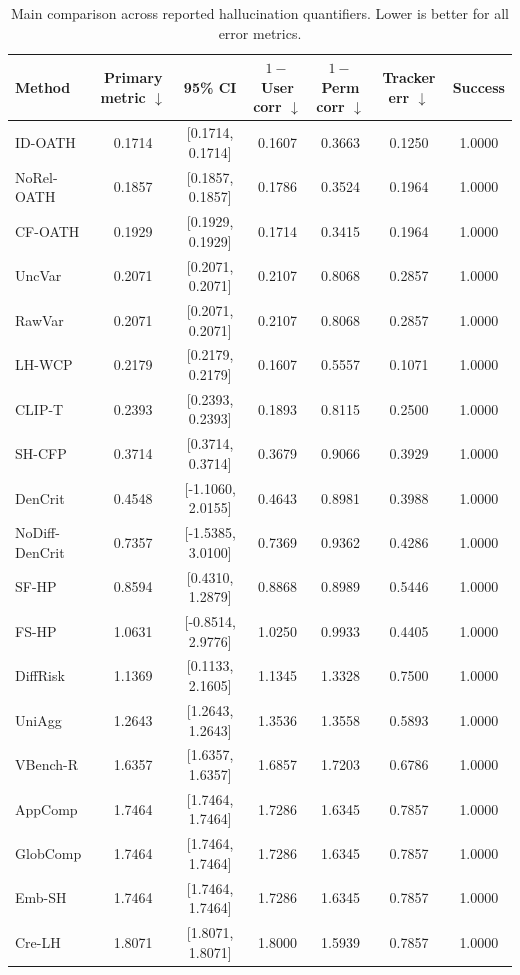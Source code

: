 \documentclass{article}
\begin{document}
\begin{table}[htbp]
    \centering
    \caption{Main comparison across reported hallucination quantifiers. Lower is better for all error metrics.}
    \label{tab:main_comparison}
    \begin{tabular}{lccccc c}
        \toprule
        Method & Primary metric \(\downarrow\) & 95\% CI & \(1-\)User corr \(\downarrow\) & \(1-\)Perm corr \(\downarrow\) & Tracker err \(\downarrow\) & Success \\
        \midrule
        ID-OATH & 0.1714 & [0.1714, 0.1714] & 0.1607 & 0.3663 & 0.1250 & 1.0000 \\
        NoRel-OATH & 0.1857 & [0.1857, 0.1857] & 0.1786 & 0.3524 & 0.1964 & 1.0000 \\
        CF-OATH & 0.1929 & [0.1929, 0.1929] & 0.1714 & 0.3415 & 0.1964 & 1.0000 \\
        UncVar & 0.2071 & [0.2071, 0.2071] & 0.2107 & 0.8068 & 0.2857 & 1.0000 \\
        RawVar & 0.2071 & [0.2071, 0.2071] & 0.2107 & 0.8068 & 0.2857 & 1.0000 \\
        LH-WCP & 0.2179 & [0.2179, 0.2179] & 0.1607 & 0.5557 & 0.1071 & 1.0000 \\
        CLIP-T & 0.2393 & [0.2393, 0.2393] & 0.1893 & 0.8115 & 0.2500 & 1.0000 \\
        SH-CFP & 0.3714 & [0.3714, 0.3714] & 0.3679 & 0.9066 & 0.3929 & 1.0000 \\
        DenCrit & 0.4548 & [-1.1060, 2.0155] & 0.4643 & 0.8981 & 0.3988 & 1.0000 \\
        NoDiff-DenCrit & 0.7357 & [-1.5385, 3.0100] & 0.7369 & 0.9362 & 0.4286 & 1.0000 \\
        SF-HP & 0.8594 & [0.4310, 1.2879] & 0.8868 & 0.8989 & 0.5446 & 1.0000 \\
        FS-HP & 1.0631 & [-0.8514, 2.9776] & 1.0250 & 0.9933 & 0.4405 & 1.0000 \\
        DiffRisk & 1.1369 & [0.1133, 2.1605] & 1.1345 & 1.3328 & 0.7500 & 1.0000 \\
        UniAgg & 1.2643 & [1.2643, 1.2643] & 1.3536 & 1.3558 & 0.5893 & 1.0000 \\
        VBench-R & 1.6357 & [1.6357, 1.6357] & 1.6857 & 1.7203 & 0.6786 & 1.0000 \\
        AppComp & 1.7464 & [1.7464, 1.7464] & 1.7286 & 1.6345 & 0.7857 & 1.0000 \\
        GlobComp & 1.7464 & [1.7464, 1.7464] & 1.7286 & 1.6345 & 0.7857 & 1.0000 \\
        Emb-SH & 1.7464 & [1.7464, 1.7464] & 1.7286 & 1.6345 & 0.7857 & 1.0000 \\
        Cre-LH & 1.8071 & [1.8071, 1.8071] & 1.8000 & 1.5939 & 0.7857 & 1.0000 \\
        \bottomrule
    \end{tabular}
\end{table}
\end{document}
